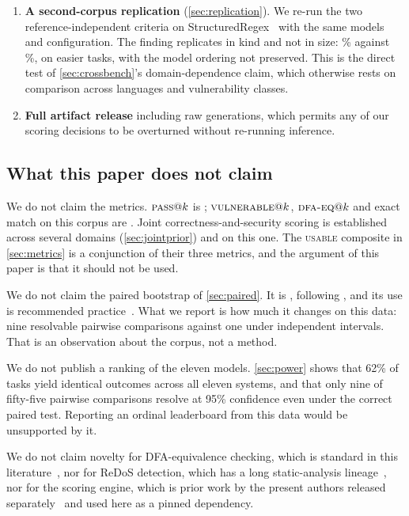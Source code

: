 \documentclass[11pt]{article}
\newcommand{\pass}{\textsc{pass}}
\newcommand{\usable}{\textsc{usable}}
\newcommand{\vuln}{\textsc{vulnerable}}
\newcommand{\dfaeq}{\textsc{dfa-eq}}
\begin{document}
\begin{enumerate}
  \item \textbf{A second-corpus replication} (\cref{sec:replication}). We
  re-run the two reference-independent criteria on
  StructuredRegex~\citep{ye2020structuredregex} with the same models and
  configuration. The finding replicates in kind and not in size: \srvulngivencorrect{}\%
  against \vulngivencorrect{}\%, on easier tasks, with the model ordering not preserved. This
  is the direct test of \cref{sec:crossbench}'s domain-dependence claim,
  which otherwise rests on comparison across languages and vulnerability
  classes.

  \item \textbf{Full artifact release} including raw generations, which
  permits any of our scoring decisions to be overturned without re-running
  inference.
\end{enumerate}

\subsection{What this paper does not claim}

We do not claim the metrics. $\pass{}@k$ is \citet{chen2021codex};
$\vuln{}@k$, $\dfaeq{}@k$ and exact match on this corpus are
\citet{siddiq2024regexeval}. Joint correctness-and-security scoring is
established across several domains (\cref{sec:jointprior}) and on this one.
The \usable{} composite in \cref{sec:metrics} is a conjunction of their three
metrics, and the argument of this paper is that it should not be used.

We do not claim the paired bootstrap of \cref{sec:paired}. It is
\citet{bergkirkpatrick2012empirical}, following \citet{koehn2004bootstrap},
and its use is recommended practice~\citep{dror2018hitchhiker}. What we
report is how much it changes on this data: nine resolvable pairwise
comparisons against one under independent intervals. That is an observation
about the corpus, not a method.

We do not publish a ranking of the eleven models. \cref{sec:power} shows
that 62\% of tasks yield identical outcomes across all eleven systems, and
that only nine of fifty-five pairwise comparisons resolve at 95\% confidence
even under the correct paired test. Reporting an ordinal leaderboard from
this data would be unsupported by it.

We do not claim novelty for DFA-equivalence checking, which is standard
in this literature~\citep{locascio2016neural}, nor for ReDoS detection,
which has a long static-analysis
lineage~\citep{kirrage2013static,wustholz2017static,sok2025redos}, nor for
the scoring engine, which is prior work by the present authors released
separately~\citep{regexbench} and used here as a pinned dependency.
\end{document}
